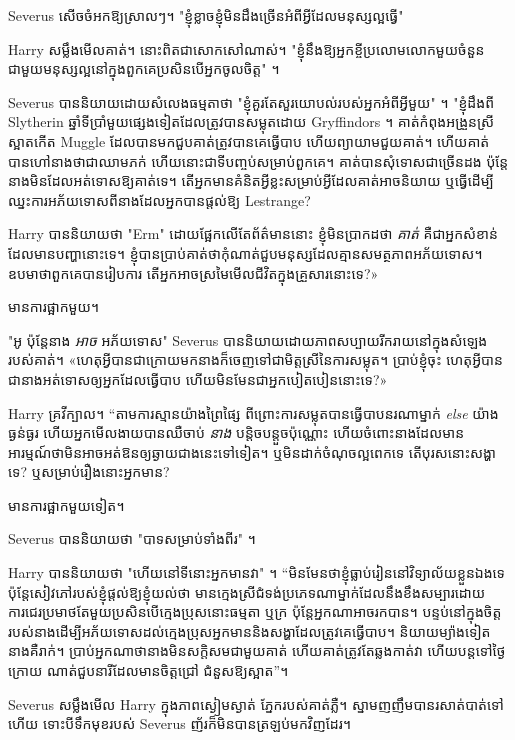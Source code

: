 {{{{{Severus សើចចំអកឱ្យស្រាលៗ។ "ខ្ញុំខ្លាចខ្ញុំមិនដឹងច្រើនអំពីអ្វីដែលមនុស្សល្អធ្វើ"

Harry សម្លឹងមើលគាត់។ នោះពិតជាសោកសៅណាស់។ "ខ្ញុំនឹងឱ្យអ្នកខ្ចីប្រលោមលោកមួយចំនួនជាមួយមនុស្សល្អនៅក្នុងពួកគេប្រសិនបើអ្នកចូលចិត្ត" ។

Severus បាននិយាយដោយសំលេងធម្មតាថា "ខ្ញុំគួរតែសួរយោបល់របស់អ្នកអំពីអ្វីមួយ" ។ "ខ្ញុំដឹងពី Slytherin ឆ្នាំទីប្រាំមួយផ្សេងទៀតដែលត្រូវបានសម្លុតដោយ Gryffindors ។ គាត់​កំពុង​អង្រួន​ស្រី​ស្អាត​កើត Muggle ដែល​បាន​មក​ជួប​គាត់​ត្រូវ​បាន​គេ​ធ្វើ​បាប ហើយ​ព្យាយាម​ជួយ​គាត់។ ហើយគាត់បានហៅនាងថាជាឈាមភក់ ហើយនោះជាទីបញ្ចប់សម្រាប់ពួកគេ។ គាត់បានសុំទោសជាច្រើនដង ប៉ុន្តែនាងមិនដែលអត់ទោសឱ្យគាត់ទេ។ តើ​អ្នក​មាន​គំនិត​អ្វី​ខ្លះ​សម្រាប់​អ្វី​ដែល​គាត់​អាច​និយាយ ឬ​ធ្វើ​ដើម្បី​ឈ្នះ​ការ​អភ័យទោស​ពី​នាង​ដែល​អ្នក​បាន​ផ្តល់​ឱ្យ Lestrange?

Harry បាននិយាយថា "Erm" ដោយផ្អែកលើតែព័ត៌មាននោះ ខ្ញុំមិនប្រាកដថា \emph{គាត់} គឺជាអ្នកសំខាន់ដែលមានបញ្ហានោះទេ។ ខ្ញុំ​បាន​ប្រាប់​គាត់​ថា​កុំ​ណាត់​ជួប​មនុស្ស​ដែល​គ្មាន​សមត្ថភាព​អភ័យទោស។ ឧបមា​ថា​ពួក​គេ​បាន​រៀប​ការ តើ​អ្នក​អាច​ស្រមៃ​មើល​ជីវិត​ក្នុង​គ្រួសារ​នោះ​ទេ?»

មានការផ្អាកមួយ។

"អូ ប៉ុន្តែនាង \emph{អាច} អភ័យទោស" Severus បាននិយាយដោយភាពសប្បាយរីករាយនៅក្នុងសំឡេងរបស់គាត់។ «ហេតុ​អ្វី​បាន​ជា​ក្រោយ​មក​នាង​ក៏​ចេញ​ទៅ​ជា​មិត្ត​ស្រី​នៃ​ការ​សម្លុត។ ប្រាប់​ខ្ញុំ​ចុះ ហេតុ​អ្វី​បាន​ជា​នាង​អត់​ទោស​ឲ្យ​អ្នក​ដែល​ធ្វើ​បាប ហើយ​មិន​មែន​ជា​អ្នក​បៀតបៀន​នោះ​ទេ?»

Harry គ្រវីក្បាល។ “តាមការស្មានយ៉ាងព្រៃផ្សៃ ពីព្រោះការសម្លុតបានធ្វើបាបនរណាម្នាក់ \emph{else} យ៉ាងធ្ងន់ធ្ងរ ហើយអ្នកមើលងាយបានឈឺចាប់ \emph{នាង} បន្តិចបន្តួចប៉ុណ្ណោះ ហើយចំពោះនាងដែលមានអារម្មណ៍ថាមិនអាចអត់ឱនឲ្យឆ្ងាយជាងនេះទៅទៀត។ ឬ​មិន​ដាក់​ចំណុច​ល្អ​ពេក​ទេ តើ​បុរស​នោះ​សង្ហា​ទេ? ឬ​សម្រាប់​រឿង​នោះ​អ្នក​មាន?

មានការផ្អាកមួយទៀត។

Severus បាននិយាយថា "បាទសម្រាប់ទាំងពីរ" ។

Harry បាននិយាយថា "ហើយនៅទីនោះអ្នកមានវា" ។ “មិនមែនថាខ្ញុំធ្លាប់រៀននៅវិទ្យាល័យខ្លួនឯងទេ ប៉ុន្តែសៀវភៅរបស់ខ្ញុំផ្តល់ឱ្យខ្ញុំយល់ថា មានក្មេងស្រីជំទង់ប្រភេទណាម្នាក់ដែលនឹងខឹងសម្បារដោយការជេរប្រមាថតែមួយប្រសិនបើក្មេងប្រុសនោះធម្មតា ឬក្រ ប៉ុន្តែអ្នកណាអាចរកបាន។ បន្ទប់នៅក្នុងចិត្តរបស់នាងដើម្បីអភ័យទោសដល់ក្មេងប្រុសអ្នកមាននិងសង្ហាដែលត្រូវគេធ្វើបាប។ និយាយម្យ៉ាងទៀតនាងគឺរាក់។ ប្រាប់អ្នកណាថានាងមិនសក្តិសមជាមួយគាត់ ហើយគាត់ត្រូវតែឆ្លងកាត់វា ហើយបន្តទៅថ្ងៃក្រោយ ណាត់ជួបនារីដែលមានចិត្តជ្រៅ ជំនួសឱ្យស្អាត”។

Severus សម្លឹងមើល Harry ក្នុងភាពស្ងៀមស្ងាត់ ភ្នែករបស់គាត់ភ្លឺ។ ស្នាម​ញញឹម​បាន​រសាត់​បាត់​ទៅ​ហើយ ទោះ​បី​ទឹក​មុខ​របស់ Severus ញ័រ​ក៏​មិន​បាន​ត្រឡប់​មក​វិញ​ដែរ។

}}}}}
